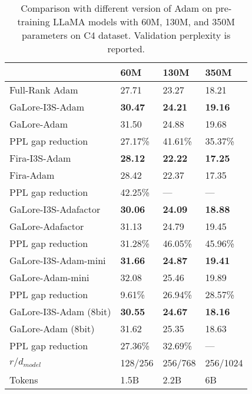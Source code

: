 \begin{table}[!ht]
    \centering
    \caption{Comparison with different version of Adam on pre-training LLaMA models with 60M, 130M, and 350M parameters on C4 dataset. Validation perplexity is reported. 
    }
    \label{tab:lora_compare_llama}
    \begin{tabular}{l p{1cm} p{1cm} p{1cm}}
    \toprule
               & \textbf{60M} & \textbf{130M} & \textbf{350M} \\
    \midrule
    Full-Rank Adam & 27.71 & 23.27 & 18.21 \\
    \midrule
    GaLore-I3S-Adam & \textbf{30.47} & \textbf{24.21} & \textbf{19.16} \\
    GaLore-Adam & 31.50 & 24.88 & 19.68 \\
    PPL gap reduction & 27.17\% & 41.61\% & 35.37\%\\
    \midrule
    Fira-I3S-Adam & \textbf{28.12} & \textbf{22.22} & \textbf{17.25} \\
    Fira-Adam & 28.42 & 22.37 & 17.35 \\
    PPL gap reduction & 42.25\% & --- & ---\\
    \midrule
    GaLore-I3S-Adafactor & \textbf{30.06} & \textbf{24.09} & \textbf{18.88} \\
    GaLore-Adafactor & 31.13 & 24.79 & 19.45 \\
    PPL gap reduction & 31.28\% & 46.05\% & 45.96\%\\
    \midrule
    GaLore-I3S-Adam-mini & \textbf{31.66} & \textbf{24.87} & \textbf{19.41} \\
    GaLore-Adam-mini & 32.08 & 25.46 & 19.89 \\
    PPL gap reduction & 9.61\% & 26.94\% & 28.57\%\\
    \midrule
    GaLore-I3S-Adam (8bit) & \textbf{30.55} & \textbf{24.67} & \textbf{18.16} \\
    GaLore-Adam (8bit) & 31.62 & 25.35 & 18.63 \\
    PPL gap reduction & 27.36\% & 32.69\% &---\\
    \bottomrule
    $r / d_{model}$ & 128/256 & 256/768 & 256/1024 \\
    Tokens & 1.5B & 2.2B & 6B \\ %
    \bottomrule
    \end{tabular}
\end{table}


